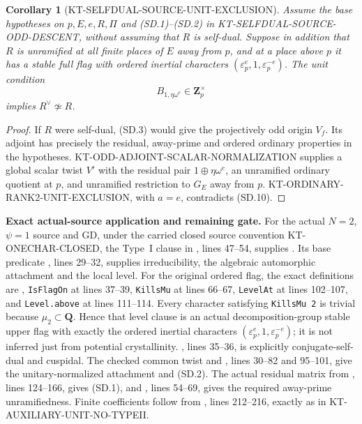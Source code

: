 \documentclass[11pt,a4paper]{article}
\newtheorem{corollary}[theorem]{Corollary}
\theoremstyle{definition}
\renewcommand{\paragraph}[1]{\par\smallskip\noindent\textbf{#1}\quad\ignorespaces}
\begin{document}
\begin{corollary}[KT-SELFDUAL-SOURCE-UNIT-EXCLUSION]
Assume the base hypotheses on $p,E,e,R,\Pi$ and (SD.1)--(SD.2)
in KT-SELFDUAL-SOURCE-ODD-DESCENT, without assuming that $R$ is
self-dual.  Suppose in addition that $R$ is unramified at all finite places of $E$
away from $p$, and at a place above $p$ it has a stable full flag
with ordered inertial characters
$(\varepsilon_p^e,1,\varepsilon_p^{-e})$.
The unit condition
\[
                          B_{1,\eta\omega^e}\in\mathbf Z_p^\times
                                                               \tag{SD.10}
\]
implies $R^\vee\not\simeq R$.
\end{corollary}

\begin{proof}
If $R$ were self-dual, (SD.3) would give the projectively odd
origin $V_f$.  Its adjoint has precisely the residual,
away-prime and ordered ordinary properties in the hypotheses.
KT-ODD-ADJOINT-SCALAR-NORMALIZATION supplies a global scalar
twist $V'$ with the residual pair $1\oplus\eta\omega^e$,
an unramified ordinary quotient at $p$, and unramified
restriction to $G_E$ away from $p$.
KT-ORDINARY-RANK2-UNIT-EXCLUSION, with $a=e$, contradicts
(SD.10).
\end{proof}

\paragraph{Exact actual-source application and remaining gate.}
For the actual $N=2$, $\psi=1$ source and GD, under the carried
closed source convention KT-ONECHAR-CLOSED, the Type~I clause
in , lines 47--54, supplies
.  Its base predicate
, lines 29--32, supplies irreducibility,
the algebraic automorphic attachment and the local level.
For the original ordered flag, the exact definitions are
,
\texttt{IsFlagOn} at lines 37--39, \texttt{KillsMu} at
lines 66--67, \texttt{LevelAt} at lines 102--107, and
\texttt{Level.above} at lines 111--114.
Every character satisfying \texttt{KillsMu 2} is trivial because
$\mu_2\subset\mathbf Q$.  Hence that level clause is an actual
decomposition-group stable upper flag with exactly the ordered
inertial characters $(\varepsilon_p^e,1,\varepsilon_p^{-e})$;
it is not inferred just from potential crystallinity.
, lines 35--36, is
explicitly conjugate-self-dual and cuspidal.
The checked common twist and ,
lines 30--82 and 95--101, give the unitary-normalized attachment
and (SD.2).  The actual residual matrix from
, lines 124--166, gives (SD.1), and
, lines 54--69, gives the required
away-prime unramifiedness.  Finite coefficients follow from
, lines 212--216, exactly as in
KT-AUXILIARY-UNIT-NO-TYPEII.
\end{document}
